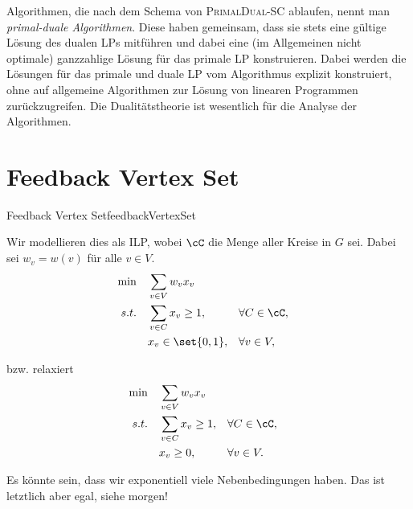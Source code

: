 \documentclass[language=ngerman,algolist]{TemplateLecture}
\begin{document}
Algorithmen, die nach dem Schema von \textsc{PrimalDual-SC} ablaufen, nennt man \emph{primal-duale Algorithmen}. Diese haben gemeinsam, dass sie stets eine gültige Lösung des dualen LPs mitführen und dabei eine (im Allgemeinen nicht optimale) ganzzahlige Lösung für das primale LP konstruieren. Dabei werden die Lösungen für das primale und duale LP vom Algorithmus explizit konstruiert, ohne auf allgemeine Algorithmen zur Lösung von linearen Programmen zurückzugreifen. Die Dualitätstheorie ist wesentlich für die Analyse der Algorithmen.

\section{Feedback Vertex Set}
\begin{prob}{Feedback Vertex Set}{feedbackVertexSet}
\end{prob}

Wir modellieren dies als ILP, wobei $\cC$ die Menge aller Kreise in $G$ sei. Dabei sei $w_v = w(v)$ für alle $v \in V$.
\begin{equation*}
    \begin{aligned}
        \min \quad & \sum_{v \in V} w_v x_v \\
        s.t. \quad & \sum_{v \in C} x_v \geq 1, && \forall C \in \cC, \\
                   & x_v \in \set{0,1}, && \forall v \in V,
    \end{aligned}
\end{equation*}

bzw. relaxiert
\begin{equation}
    \begin{aligned}
        \min \quad & \sum_{v \in V} w_v x_v \\
        s.t. \quad & \sum_{v \in C} x_v \geq 1, && \forall C \in \cC, \\
                   & x_v \geq 0, && \forall v \in V.
    \end{aligned}\label{eq:FVSPrimal}
\end{equation}

Es könnte sein, dass wir exponentiell viele Nebenbedingungen haben. Das ist letztlich aber egal, siehe morgen!

\end{document}
